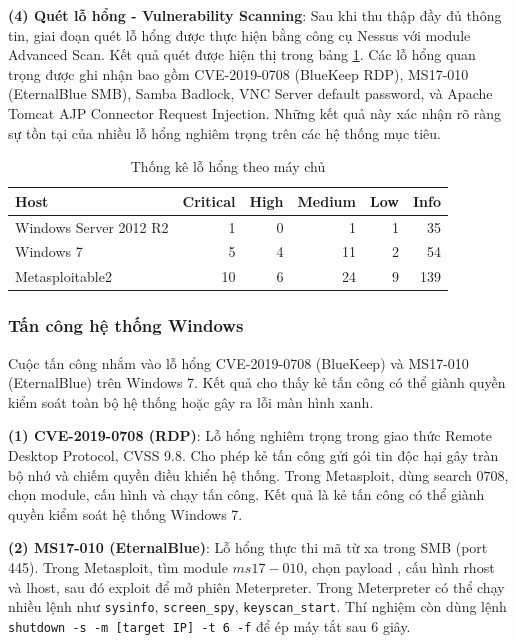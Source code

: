 \documentclass[conference]{IEEEtran}
\begin{document}
\textbf{(4) Quét lỗ hổng - Vulnerability Scanning}: Sau khi thu thập đầy đủ thông tin, giai đoạn quét lỗ hổng được thực hiện bằng công cụ Nessus với module Advanced Scan. Kết quả quét được hiện thị trong bảng \ref{tab:vulnerability-summary}. Các lỗ hổng quan trọng được ghi nhận bao gồm CVE-2019-0708 (BlueKeep RDP), MS17-010 (EternalBlue SMB), Samba Badlock, VNC Server default password, và Apache Tomcat AJP Connector Request Injection. Những kết quả này xác nhận rõ ràng sự tồn tại của nhiều lỗ hổng nghiêm trọng trên các hệ thống mục tiêu.

\begin{table}[h]
\centering
\caption{Thống kê lỗ hổng theo máy chủ} 
\label{tab:vulnerability-summary}
\begin{tabular}{l|rrrrr}
\toprule
\textbf{Host} & \textbf{Critical} & \textbf{High} & \textbf{Medium} & \textbf{Low} & \textbf{Info} \\
\midrule
Windows Server 2012 R2 & 1 & 0 & 1 & 1 & 35 \\
Windows 7 & 5 & 4 & 11 & 2 & 54 \\
Metasploitable2 & 10 & 6 & 24 & 9 & 139 \\
\bottomrule
\end{tabular}
\end{table}

\subsubsection{Tấn công hệ thống Windows} 
Cuộc tấn công nhắm vào lỗ hổng CVE-2019-0708 (BlueKeep) và MS17-010 (EternalBlue) trên Windows 7. Kết quả cho thấy kẻ tấn công có thể giành quyền kiểm soát toàn bộ hệ thống hoặc gây ra lỗi màn hình xanh.

\textbf{(1) CVE-2019-0708 (RDP)}: Lỗ hổng nghiêm trọng trong giao thức Remote Desktop Protocol, CVSS 9.8. Cho phép kẻ tấn công gửi gói tin độc hại gây tràn bộ nhớ và chiếm quyền điều khiển hệ thống. Trong Metasploit, dùng search $0708$, chọn module, cấu hình và chạy tấn công. Kết quả là kẻ tấn công có thể giành quyền kiểm soát hệ thống Windows 7.

\textbf{(2) MS17-010 (EternalBlue)}:  Lỗ hổng thực thi mã từ xa trong SMB (port 445). Trong Metasploit, tìm module $ms17-010$, chọn payload , cấu hình rhost và lhost, sau đó exploit để mở phiên Meterpreter. Trong Meterpreter có thể chạy nhiều lệnh như \texttt{sysinfo}, \texttt{screen\_spy}, \texttt{keyscan\_start}. Thí nghiệm còn dùng lệnh \texttt{shutdown -s -m [target IP] -t 6 -f} để ép máy tắt sau 6 giây.
\end{document}
